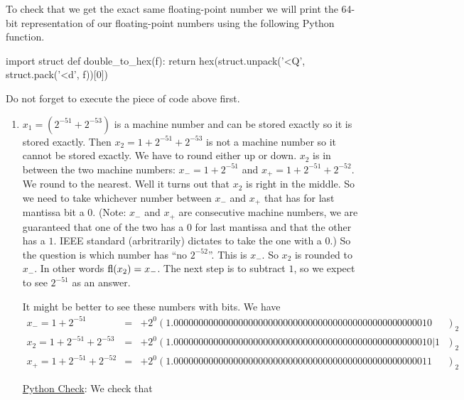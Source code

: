 \documentclass[pdftex,11pt]{article}
\begin{document}
To check that we get the exact same floating-point number we will print the 64-bit representation of our floating-point numbers
using the following Python function.
\begin{python}
import struct
def double_to_hex(f):
  return hex(struct.unpack('<Q', struct.pack('<d', f))[0])
\end{python}
Do not forget to execute the piece of code above first.







\begin{enumerate}
\item $x_1 = (2^{-51} + 2^{-53})$ is a machine number and can be stored exactly so it is stored exactly.
Then $x_2 = 1 + 2^{-51} + 2^{-53}$ is not a machine number so it cannot be stored exactly. We have to round either up or down. 
$x_2$ is in between the two machine numbers: $x_-=1 + 2^{-51}$ and $x_+=1 + 2^{-51} + 2^{-52}$.
We round to the nearest. Well it turns out that $x_2$ is right in the middle. 
So we need to take whichever number between $x_-$ and $x_+$ that has for last mantissa bit a $0$. 
(Note: $x_-$ and $x_+$ are consecutive machine numbers, we are guaranteed that one of the two has a $0$ for last mantissa and that the other has a $1$.
IEEE standard (arbritrarily) dictates to take the one with a $0$.) So the question is which number has ``no $2^{-52}$''. This is $x_-$.
So $x_2$ is rounded to $x_-$. In other words $\textmd{fl}(x_2)=x_-$. The next step is to subtract $1$, so we expect to see $2^{-51}$ as an answer.
\begin{center}
\end{center}

It might be better to see these numbers with bits. 
We have
\begin{eqnarray}
 \nonumber x_- = 1 + 2^{-51}            & = &  + 2^{0} ( 1.0000000000000000000000000000000000000000000000000010\phantom{|1}~~~)_2\\
 \nonumber x_2 = 1 + 2^{-51} + 2^{-53}  & = &  + 2^{0} ( 1.0000000000000000000000000000000000000000000000000010|1~~~)_2\\ 
 \nonumber x_+ = 1 + 2^{-51} + 2^{-52}  & = &  + 2^{0} ( 1.0000000000000000000000000000000000000000000000000011\phantom{|1}~~~)_2
\end{eqnarray}


\underline{Python Check}: We check that


\end{enumerate}
\end{document}
